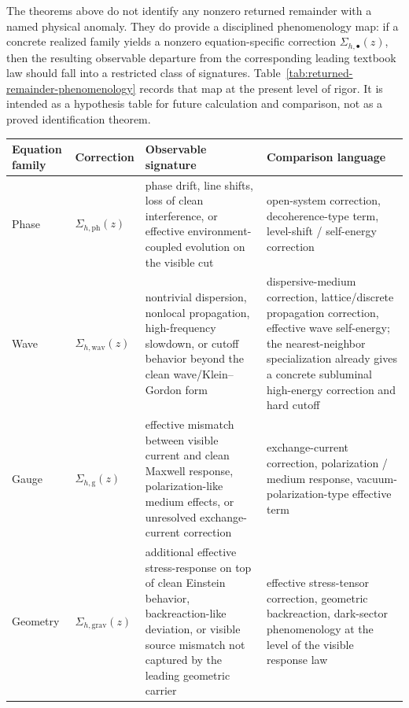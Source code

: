The theorems above do not identify any nonzero returned remainder with a named
physical anomaly. They do provide a disciplined
phenomenology map: if a concrete realized family yields a nonzero equation-specific
correction \(\Sigma_{h,\bullet}(z)\), then the resulting observable departure
from the corresponding leading textbook law should fall into a restricted class
of signatures. Table~\ref{tab:returned-remainder-phenomenology} records that
map at the present level of rigor. It is intended as a hypothesis table for
future calculation and comparison, not as a proved identification theorem.

\begin{table}[ht]
\centering
\scriptsize
\setlength{\tabcolsep}{3pt}
\begin{tabular}{@{}P{1.6cm}P{2.7cm}P{4.7cm}P{4.5cm}@{}}
\toprule
Equation family & Correction & Observable signature & Comparison language \\
\midrule
Phase
& \(\Sigma_{h,\mathrm{ph}}(z)\)
& phase drift, line shifts, loss of clean interference, or effective
  environment-coupled evolution on the visible cut
& open-system correction, decoherence-type term, level-shift / self-energy
  correction \\

Wave
& \(\Sigma_{h,\mathrm{wav}}(z)\)
& nontrivial dispersion, nonlocal propagation, high-frequency slowdown, or
  cutoff behavior beyond the clean wave/Klein--Gordon form
& dispersive-medium correction, lattice/discrete propagation correction,
  effective wave self-energy; the nearest-neighbor specialization already gives
  a concrete subluminal high-energy correction and hard cutoff \\

Gauge
& \(\Sigma_{h,\mathrm g}(z)\)
& effective mismatch between visible current and clean Maxwell response,
  polarization-like medium effects, or unresolved exchange-current correction
& exchange-current correction, polarization / medium response,\newline
  vacuum-polarization-type effective term \\

Geometry
& \(\Sigma_{h,\mathrm{grav}}(z)\)
& additional effective stress-response on top of clean Einstein behavior,
  backreaction-like deviation, or visible source mismatch not captured by the
  leading geometric carrier
& effective stress-tensor correction, geometric backreaction,\newline
  dark-sector phenomenology at the level of the visible response law \\


\end{tabular}
\end{table}
